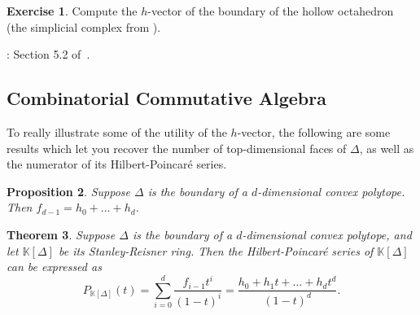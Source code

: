 \documentclass[12pt,a4paper]{article}
\newcommand{\KK}{\mathbb{K}}
\newtheorem{theorem}{Theorem}[section]
\newtheorem{proposition}[theorem]{Proposition}
\theoremstyle{definition}
\newtheorem{exercise}[theorem]{Exercise}
\numberwithin{equation}{section}
\begin{document}
\begin{exercise}
    Compute the $h$-vector of the boundary of the hollow octahedron (the simplicial complex from ).
\end{exercise}

\vspace*{1cm}

: Section 5.2 of~\cite{schenck_computational_2003}.

\vspace*{1cm}


\subsection{Combinatorial Commutative Algebra}
To really illustrate some of the utility of the $h$-vector, the following are some results which let you recover the number of top-dimensional faces of $\Delta$, as well as the numerator of its Hilbert-Poincar\'e series.

\begin{proposition}
    Suppose $\Delta$ is the boundary of a $d$-dimensional convex polytope.
    Then $f_{d-1} = h_0 + \dots + h_d$.
\end{proposition}

\begin{theorem}
    \label{theorem:sr hilbert poincare}
    Suppose $\Delta$ is the boundary of a $d$-dimensional convex polytope, and let $\KK[\Delta]$ be its Stanley-Reisner ring.
    Then the Hilbert-Poincar\'e series of $\KK[\Delta]$ can be expressed as
    \begin{equation*}
        P_{\KK[\Delta]}(t) = \sum_{i=0}^d \frac{f_{i-1} t^i}{(1-t)^i} = \frac{h_0 + h_1 t + \dots + h_d t^d}{(1-t)^d}.
    \end{equation*}
\end{theorem}
\end{document}

